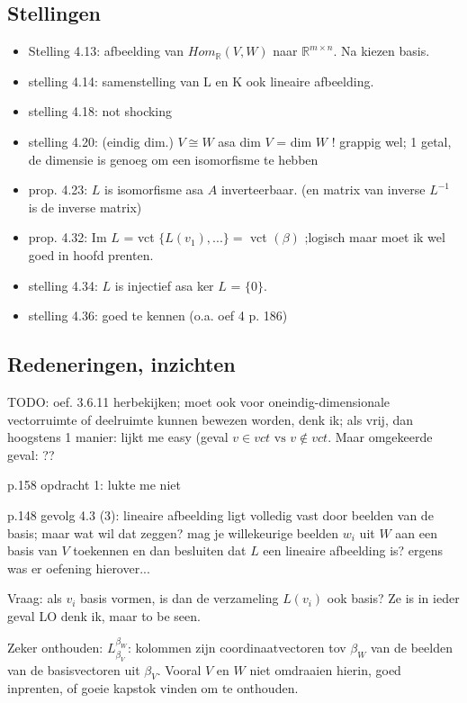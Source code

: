 \documentclass{article}
\begin{document}
\subsection{Stellingen}
\begin{itemize}
    \item Stelling 4.13: afbeelding van $Hom_{\mathbb{R}}(V,W)$ naar $\mathbb{R}^{m \times n}$. Na kiezen basis. 
    \item stelling 4.14: samenstelling van L en K ook lineaire afbeelding. 
    \item stelling 4.18: not shocking 
    \item stelling 4.20: (eindig dim.) $V \cong W$ asa dim $V$ = dim $W$ ! grappig wel; 1 getal, de dimensie is genoeg om een isomorfisme te hebben
    \item prop. 4.23: $L$ is isomorfisme asa $A$ inverteerbaar. (en matrix van inverse $L^{-1}$ is de inverse matrix) 
    \item prop. 4.32: Im $L$ = vct $\{ L(v_1), ... \} = $ vct $(\beta)$ ;logisch maar moet ik wel goed in hoofd prenten. 
    \item stelling 4.34: $L$ is injectief asa ker $L$ = $\{ 0 \}$. 
    \item stelling 4.36: goed te kennen (o.a. oef 4 p. 186)  
\end{itemize}

\subsection{Redeneringen, inzichten}

TODO: oef. 3.6.11 herbekijken; moet ook voor oneindig-dimensionale vectorruimte of deelruimte kunnen bewezen worden, denk ik; 
als vrij, dan hoogstens 1 manier: lijkt me easy (geval $v \in vct \text{ vs } v \notin vct$. 
Maar omgekeerde geval: ?? 

p.158 opdracht 1: lukte me niet 

p.148 gevolg 4.3 (3): lineaire afbeelding ligt volledig vast door beelden van de basis; maar wat wil dat zeggen? mag je willekeurige beelden $w_i$ uit $W$ aan een basis van $V$ toekennen en dan 
besluiten dat $L$ een lineaire afbeelding is? ergens was er oefening hierover... 

Vraag: als $v_i$ basis vormen, is dan de verzameling $L(v_i)$ ook basis? Ze is in ieder geval LO denk ik, maar to be seen. 

Zeker onthouden: $L_{\beta_V}^{\beta_W}$: kolommen zijn coordinaatvectoren tov $\beta_W$ van de beelden van de basisvectoren uit $\beta_V$. Vooral $V$ en $W$ niet omdraaien hierin, goed inprenten, of goeie kapstok vinden om te onthouden. 
\end{document}
